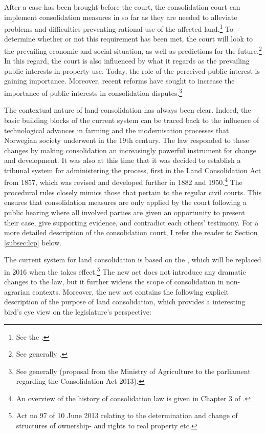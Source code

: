 After a case has been brought before the court, the consolidation court can implement consolidation measures in so far as they are needed to alleviate problems and difficulties preventing rational use of the affected land.\footnote{See the \cite[1]{lca79}.} To determine whether or not this requirement has been met, the court will look to the prevailing economic and social situation, as well as predictions for the future.\footnote{See generally \cite{reiten09}.} In this regard, the court is also influenced by what it regards as the prevailing public interests in property use. Today, the role of the perceived public interest is gaining importance. Moreover,  recent reforms have sought to increase the importance of public interests in consolidation disputes.\footnote{See generally \cite{prop12} (proposal from the Ministry of Agriculture to the parliament regarding the Consolidation Act 2013).}

The contextual nature of land consolidation has always been clear. Indeed, the basic building blocks of the current system can be traced back to the influence of technological advances in farming and the modernisation processes that Norwegian society underwent in the 19th century. The law responded to these changes by making consolidation an increasingly powerful instrument for change and development. It was also at this time that it was decided to establish a tribunal system for administering the process, first in the Land Consolidation Act from 1857, which was revised and developed further in 1882 and 1950.\footnote{An overview of the history of consolidation law is given in Chapter 3 of \cite{prop12}.} The procedural rules closely mimics those that pertain to the regular civil courts. This ensures that consolidation measures are only applied by the court following a public hearing where all involved parties are given an opportunity to present their case, give supporting evidence, and contradict each others' testimony. For a more detailed description of the consolidation court, I refer the reader to Section \ref{subsec:lcp} below.

The current system for land consolidation is based on the \cite{lca79}, which will be replaced in 2016 when the \cite{lca13} takes effect.\footnote{Act no 97 of 10 June 2013 relating to the determination and change of structures of ownership- and rights to real property etc.} The new act does not introduce any dramatic changes to the law, but it further widens the scope of consolidation in non-agrarian contexts. Moreover, the new act contains the following explicit description of the purpose of land consolidation, which provides a interesting bird's eye view on the legislature's perspective:

